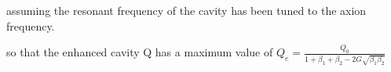 \documentclass[aps,prl,twocolumn,groupedaddress]{revtex4-1}
\begin{document}
    assuming the resonant frequency of the cavity has been tuned to the axion frequency. 


so that the enhanced cavity Q has a maximum value of 
$Q_e = \frac{Q_0}{1 + \beta_1 + \beta_2 - 2G\sqrt{\beta_1 \beta_2}}$
\end{document}
